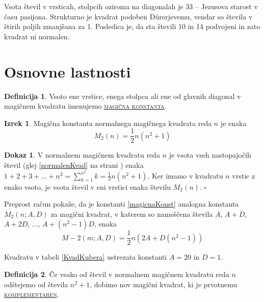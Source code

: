 \documentclass[a4paper,12pt]{article}
\newcommand{\pojem}[1]{\underline{\textsc{#1}}}
\renewcommand{\qed}{\hfill\ensuremath{\square}}
\theoremstyle{definition}
\newtheorem{definicija}{Definicija}
\newtheorem{izrek}{Izrek}
\theoremstyle{definition}
\newtheorem*{dokaz}{Dokaz}
\begin{document}
Vsota števil v vrsticah, stolpcih oziroma na diagonalah je 33 -- Jezusova 
starost v času pasijona. Strukturno je kvadrat podoben Dürerjevemu, vendar so 
števila v štirih poljih zmanjšana za 1. Posledica je, da sta števili 10 in 14 
podvojeni in zato kvadrat ni normalen.


\section{Osnovne lastnosti}

\begin{definicija}
   Vsoto ene vrstice, enega stolpca ali ene od glavnih diagonal
   v magičnem kvadratu imenujemo \pojem{magična konstanta}.
\end{definicija}

\begin{izrek}
   Magična konstanta normalnega magičnega kvadrata reda $ n $
   je enaka
   \begin{equation}
      M_2(n) = \frac{1}{2} n(n^2 + 1)
      \label{magicnaKonst}
   \end{equation}
\end{izrek}


\begin{dokaz}
   V normalnem magičnem kvadratu reda $ n $ je vsota vseh nastopajočih
   števil (glej \eqref{normalenKvad} na strani \pageref{normalenKvad}) enaka
   $ 1 + 2 + 3 + \dots + n^2 = \sum_{k = 1}^{n^2} k = \frac{1}{2} n(n^2 + 1) $. 
   Ker imamo v kvadratu $ n $ vrstic z enako vsoto, je vsota števil v eni 
   vrstici enaka številu $ M_2(n) $. \qed
\end{dokaz}

Preprost račun pokaže, da je konstanti \eqref{magicnaKonst} analogna konstanta
$ M_2(n; A,D) $ za magični kvadrat, v katerem so nameščena števila
$ A $, $ A + D$, $ A + 2 D $, $ \dots $, $ A + (n^2 - 1) D $, enaka
\begin{equation*}
   M-2(m; A,D) = \frac{1}{2} n \left(2 A + D (n^2 - 1) \right)    
\end{equation*}

Kvadratu v tabeli \ref{KvadKubera} ustrezata konstanti $ A = 20 $ in $ D = 1 $.

\begin{definicija}
   Če vsako od števil v normalnem magičnem kvadratu reda $ n $ odštejemo
   od števila $ n^2 + 1 $, dobimo nov magični kvadrat, ki je prvotnemu
   \pojem{komplementaren}.
\end{definicija}
\end{document}

